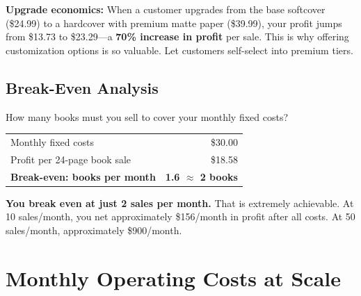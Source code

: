 \documentclass[12pt, letterpaper, oneside]{book}
\begin{document}
\begin{infobox}
\textbf{Upgrade economics:} When a customer upgrades from the base softcover (\$24.99) to a hardcover with premium matte paper (\$39.99), your profit jumps from \$13.73 to \$23.29---a \textbf{70\% increase in profit} per sale. This is why offering customization options is so valuable. Let customers self-select into premium tiers.
\end{infobox}

\section{Break-Even Analysis}

How many books must you sell to cover your monthly fixed costs?

\begin{table}[H]
\centering
\begin{tabular}{lr}
\toprule
Monthly fixed costs & \$30.00 \\
Profit per 24-page book sale & \$18.58 \\
\midrule
\textbf{Break-even: books per month} & \textbf{1.6 $\approx$ 2 books} \\
\bottomrule
\end{tabular}
\end{table}

\begin{successbox}
\textbf{You break even at just 2 sales per month.} That is extremely achievable. At 10 sales/month, you net approximately \$156/month in profit after all costs. At 50 sales/month, approximately \$900/month.
\end{successbox}


\chapter{Monthly Operating Costs at Scale}
\end{document}

